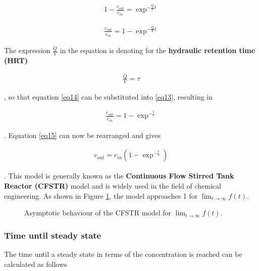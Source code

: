 \documentclass{scrartcl}
\begin{document}
\begin{align}
	1 - \frac{c_{out}}{c_{in}} = \exp^{-\frac{Q}{V}t}
\end{align}

\begin{align}
	\frac{c_{out}}{c_{in}} = 1 - \exp^{-\frac{Q}{V}t}
	\label{eq13}
\end{align}

The expression $\frac{Q}{V}$ in the equation is denoting for the \textbf{hydraulic retention time (HRT)}

\begin{align}
	\frac{Q}{V} = \tau
	\label{eq14}
\end{align}

, so that equation \ref{eq14} can be substituted into \ref{eq13}, resulting in 

\begin{align}
	\frac{c_{out}}{c_{in}} = 1 - \exp^{-\frac{t}{\tau}}
	\label{eq15}
\end{align}

. Equation \ref{eq15} can now be rearranged and gives

\begin{align}
	c_{out} = c_{in} (1 - \exp^{-\frac{t}{\tau}})
	\label{eq16}
\end{align}

. This model is generally known as the \textbf{Continuous Flow Stirred Tank Reactor (CFSTR)} model and is widely used in the field of chemical engineering. As shown in Figure \ref{fig1}, the model approaches 1 for $\lim_{t \to \infty}f(t)$.\\
%
%
%
%
\begin{figure}
	\centering
	\caption{Asymptotic behaviour of the CFSTR model for $\lim_{t \to \infty}f(t)$.}
	\label{fig1}
\end{figure}
%
%
\subsubsection{Time until steady state}
The time until a steady state in terms of the concentration is reached can be calculated as follows
\end{document}
